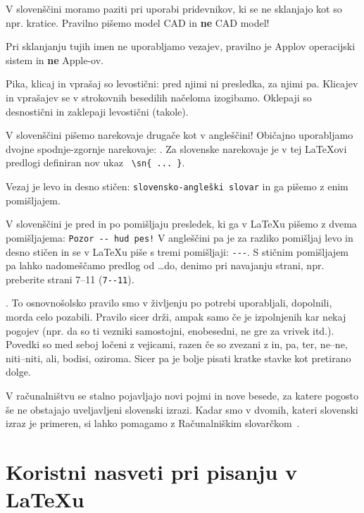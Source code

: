 \documentclass[a4paper, 12pt]{book}
\begin{document}
V slovenščini moramo paziti  pri uporabi pridevnikov, ki se ne sklanjajo kot so npr. kratice. 
Pravilno pišemo model CAD in \textbf{ne} CAD model!

Pri sklanjanju tujih imen ne uporabljamo vezajev, pravilno je Applov operacijski sistem in \textbf{ne} Apple-ov.

Pika, klicaj in vprašaj so levostični: pred njimi ni presledka, za njimi pa. 
Klicajev in vprašajev se v strokovnih besedilih načeloma izogibamo. Oklepaji so desnostični in zaklepaji levostični (takole).

V slovenščini pišemo narekovaje drugače kot v angleščini!   
Običajno uporabljamo dvojne spodnje-zgornje narekovaje:  .
Za slovenske narekovaje je v tej LaTeXovi predlogi definiran nov ukaz \verb+ \sn{ ... }+.

Vezaj  je levo in desno stičen: \verb=slovensko-angleški slovar= in ga pišemo z enim pomišljajem.

V slovenščini je pred in po pomišljaju presledek, ki ga v LaTeXu pišemo z dvema pomišljajema: \verb=Pozor -- hud pes!=
V angleščini pa je za razliko pomišljaj levo in desno stičen in se v LaTeXu piše s tremi  pomišljaji: \verb=---=.
S stičnim pomišljajem pa lahko nadomeščamo predlog od \dots do, denimo pri navajanju strani, npr. preberite strani 7--11 (\verb=7--11=).



. To osnovnošolsko pravilo smo v življenju po potrebi uporabljali, dopolnili, morda celo pozabili. 
Pravilo sicer drži, ampak samo če je izpolnjenih kar nekaj pogojev (npr. da so ti vezniki samostojni, enobesedni, ne gre za vrivek itd.).
Povedki so med seboj ločeni z vejicami, razen če so zvezani z in, pa, ter, ne–ne, niti–niti, ali, bodisi, oziroma.
Sicer pa je bolje pisati kratke stavke kot pretirano dolge.

V računalništvu se stalno pojavljajo novi pojmi in nove besede, za katere pogosto še ne obstajajo uveljavljeni slovenski izrazi.
Kadar smo v dvomih, kateri slovenski izraz je primeren, si lahko pomagamo z Računalniškim slovarčkom~\cite{slovarcek}.





\chapter{Koristni nasveti pri pisanju v \LaTeX{u}}   %
\label{latex}
\end{document}
